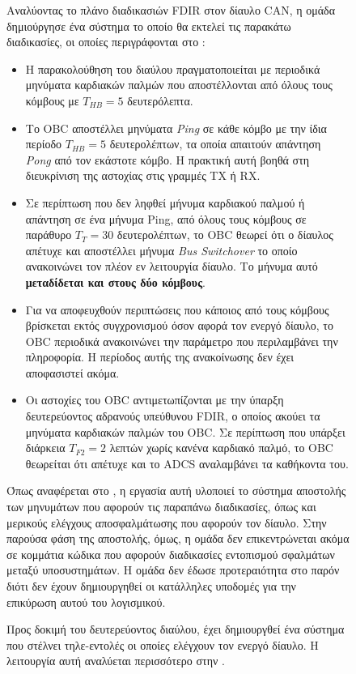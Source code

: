 \documentclass[a4paper,nobib,justified]{tufte-book}
\begin{document}
\begin{figure}
Αναλύοντας το πλάνο διαδικασιών FDIR στον δίαυλο CAN, η ομάδα δημιούργησε ένα σύστημα το οποίο θα εκτελεί τις παρακάτω διαδικασίες, οι οποίες περιγράφονται στο :
\begin{itemize}
	\item Η παρακολούθηση του διαύλου πραγματοποιείται με περιοδικά μηνύματα καρδιακών παλμών που αποστέλλονται από όλους τους κόμβους με $T_{HB} = 5$ δευτερόλεπτα.
	\item Το OBC αποστέλλει μηνύματα \emph{Ping} σε κάθε κόμβο με την ίδια περίοδο $T_{HB} = 5$ δευτερολέπτων, τα οποία απαιτούν απάντηση \emph{Pong} από τον εκάστοτε κόμβο. Η πρακτική αυτή βοηθά στη διευκρίνιση της αστοχίας στις γραμμές TX ή RX.
	\item Σε περίπτωση που δεν ληφθεί μήνυμα καρδιακού παλμού ή απάντηση σε ένα μήνυμα Ping, από όλους τους κόμβους σε παράθυρο $T_T = 30$ δευτερολέπτων, το OBC θεωρεί ότι ο δίαυλος απέτυχε και αποστέλλει μήνυμα \emph{Bus Switchover} το οποίο ανακοινώνει τον πλέον εν λειτουργία δίαυλο. Το μήνυμα αυτό \textbf{μεταδίδεται και στους δύο κόμβους}.
	\item Για να αποφευχθούν περιπτώσεις που κάποιος από τους κόμβους βρίσκεται εκτός συγχρονισμού όσον αφορά τον ενεργό δίαυλο, το OBC περιοδικά ανακοινώνει την παράμετρο που περιλαμβάνει την πληροφορία. Η περίοδος αυτής της ανακοίνωσης δεν έχει αποφασιστεί ακόμα.
	\item Oι αστοχίες του OBC αντιμετωπίζονται με την ύπαρξη δευτερεύοντος αδρανούς	υπεύθυνου FDIR, ο οποίος ακούει τα μηνύματα καρδιακών παλμών του OBC. Σε περίπτωση που υπάρξει διάρκεια $T_{F2} = 2$ λεπτών χωρίς κανένα καρδιακό παλμό, το OBC θεωρείται ότι απέτυχε και το ADCS αναλαμβάνει τα καθήκοντα του.
\end{itemize}

Όπως αναφέρεται στο , η εργασία αυτή υλοποιεί το σύστημα αποστολής των μηνυμάτων που αφορούν τις παραπάνω διαδικασίες, όπως και μερικούς ελέγχους αποσφαλμάτωσης που αφορούν τον δίαυλο. Στην παρούσα φάση της αποστολής, όμως, η ομάδα δεν επικεντρώνεται ακόμα σε κομμάτια κώδικα που αφορούν διαδικασίες εντοπισμού σφαλμάτων μεταξύ υποσυστημάτων. Η ομάδα δεν έδωσε προτεραιότητα στο παρόν διότι δεν έχουν δημιουργηθεί οι κατάλληλες υποδομές για την επικύρωση αυτού του λογισμικού.

Προς δοκιμή του δευτερεύοντος διαύλου, έχει δημιουργθεί ένα σύστημα που στέλνει τηλε-εντολές οι οποίες ελέγχουν τον ενεργό δίαυλο. Η λειτουργία αυτή αναλύεται περισσότερο στην .


\end{figure}
\end{document}

